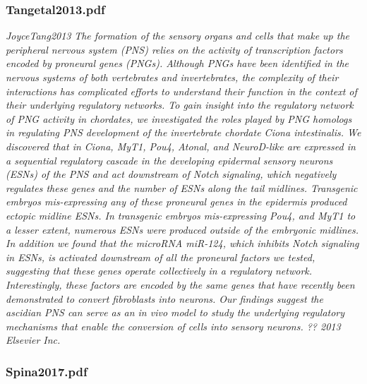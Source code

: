 \documentclass[graybox]{svmult}
\begin{document}
\subsubsection{Tangetal2013.pdf}
\textit{JoyceTang2013}
\textit{The formation of the sensory organs and cells that make up the 
peripheral nervous system (PNS) relies on the activity of transcription factors 
encoded by proneural genes (PNGs). Although PNGs have been identified in the 
nervous systems of both vertebrates and invertebrates, the complexity of their 
interactions has complicated efforts to understand their function in the context 
of their underlying regulatory networks. To gain insight into the regulatory 
network of PNG activity in chordates, we investigated the roles played by PNG 
homologs in regulating PNS development of the invertebrate chordate Ciona 
intestinalis. We discovered that in Ciona, MyT1, Pou4, Atonal, and NeuroD-like 
are expressed in a sequential regulatory cascade in the developing epidermal 
sensory neurons (ESNs) of the PNS and act downstream of Notch signaling, which 
negatively regulates these genes and the number of ESNs along the tail midlines. 
Transgenic embryos mis-expressing any of these proneural genes in the epidermis 
produced ectopic midline ESNs. In transgenic embryos mis-expressing Pou4, and 
MyT1 to a lesser extent, numerous ESNs were produced outside of the embryonic 
midlines. In addition we found that the microRNA miR-124, which inhibits Notch 
signaling in ESNs, is activated downstream of all the proneural factors we 
tested, suggesting that these genes operate collectively in a regulatory 
network. Interestingly, these factors are encoded by the same genes that have 
recently been demonstrated to convert fibroblasts into neurons. Our findings 
suggest the ascidian PNS can serve as an in vivo model to study the underlying 
regulatory mechanisms that enable the conversion of cells into sensory neurons. 
?? 2013 Elsevier Inc.}

\subsubsection{Spina2017.pdf}
\end{document}
